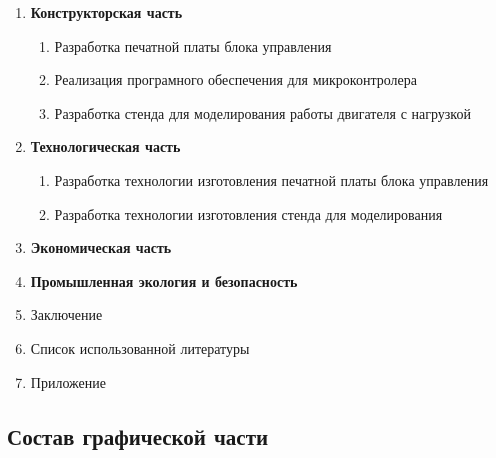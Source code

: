 \begin{enumerate}
\begin{enumerate}
        \end{enumerate}
    \item \textbf{Конструкторская часть}
        \begin{enumerate}
            \item Разработка печатной платы блока управления
            \item Реализация програмного обеспечения для микроконтролера
            \item Разработка стенда для моделирования работы двигателя с нагрузкой
        \end{enumerate}
    \item \textbf{Технологическая часть}
        \begin{enumerate}
            \item Разработка технологии изготовления печатной платы блока управления
            \item Разработка технологии изготовления стенда для моделирования
        \end{enumerate}
    \item \textbf{Экономическая часть}
    \item \textbf{Промышленная экология и безопасность}
    \item{Заключение}
    \item{Список использованной литературы}
    \item{Приложение}
\end{enumerate}

\newpage
\subsection{Состав графической части}

